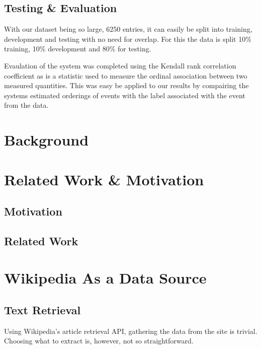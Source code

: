 \documentclass[bsc,frontabs,twoside,singlespacing,parskip,deptreport]{infthesis}     %
\begin{document}


\section{Testing \& Evaluation}
With our dataset being so large, 6250 entries, it can
easily be split into training, development and testing with no
need for overlap. For this the data is split 10\% training,
10\% development and 80\% for testing.

Evaulation of the system was completed using the
Kendall rank correlation coefficient as is a statistic
used to measure the ordinal association between two
measured quantities. This was easy be applied to our results
by compairing the systems estimated orderings of events
with the label associated with the event from the data.

\chapter{Background}

\chapter{Related Work \& Motivation}
\section{Motivation}
\section{Related Work}


\chapter{Wikipedia As a Data Source}
\section{Text Retrieval}
Using Wikipedia's article retrieval API, gathering the data from
the site is trivial. Choosing what to extract is, however, not
so straightforward.
\end{document}
